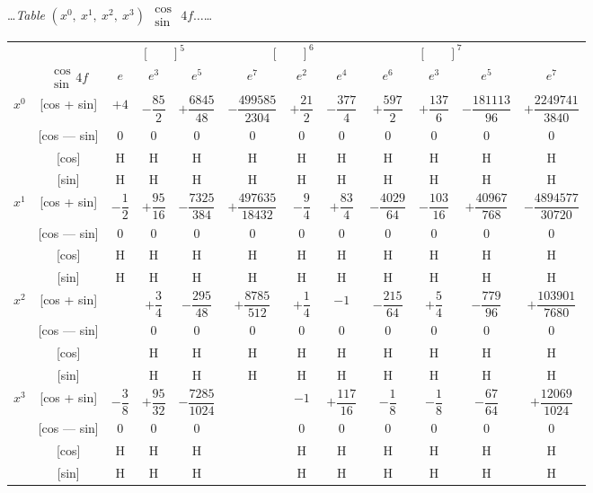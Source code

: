 \documentclass[10pt,a4paper]{article}
\newcommand{\tabletitle}[2]{%
  \begin{center}
  \ldots\textit{Table} #1 $\displaystyle\begin{smallmatrix} \cos \\ \sin \end{smallmatrix}$ #2\ldots
  \end{center}
}
\begin{document}
\newpage
\tabletitle{$(x^0,\ x^1,\ x^2,\ x^3)$}{$4f\ldots$}

\begin{center}
\small
\begin{tabular}{|c|c|c|c|c|c|c|c|c|c|c|c|}
\hline
& & \multicolumn{3}{c|}{$[\phantom{()}]^5$} & \multicolumn{3}{c|}{$[\phantom{()}]^6$} & \multicolumn{3}{c|}{$[\phantom{()}]^7$} \\
\cline{3-11}
& $\begin{smallmatrix} \cos \\ \sin \end{smallmatrix} 4f$ & $e$ & $e^3$ & $e^5$ & $e^7$ & $e^2$ & $e^4$ & $e^6$ & $e^3$ & $e^5$ & $e^7$ \\
\hline
\multirow{4}{*}{$x^0$} & [cos + sin] & $+4$ & $-\dfrac{85}{2}$ & $+\dfrac{6845}{48}$ & $-\dfrac{499585}{2304}$ & $+\dfrac{21}{2}$ & $-\dfrac{377}{4}$ & $+\dfrac{597}{2}$ & $+\dfrac{137}{6}$ & $-\dfrac{181113}{96}$ & $+\dfrac{2249741}{3840}$ \\
& [cos --- sin] & $0$ & $0$ & $0$ & $0$ & $0$ & $0$ & $0$ & $0$ & $0$ & $0$ \\
& [cos] & H & H & H & H & H & H & H & H & H & H \\
& [sin] & H & H & H & H & H & H & H & H & H & H \\
\hline
\multirow{4}{*}{$x^1$} & [cos + sin] & $-\dfrac{1}{2}$ & $+\dfrac{95}{16}$ & $-\dfrac{7325}{384}$ & $+\dfrac{497635}{18432}$ & $-\dfrac{9}{4}$ & $+\dfrac{83}{4}$ & $-\dfrac{4029}{64}$ & $-\dfrac{103}{16}$ & $+\dfrac{40967}{768}$ & $-\dfrac{4894577}{30720}$ \\
& [cos --- sin] & $0$ & $0$ & $0$ & $0$ & $0$ & $0$ & $0$ & $0$ & $0$ & $0$ \\
& [cos] & H & H & H & H & H & H & H & H & H & H \\
& [sin] & H & H & H & H & H & H & H & H & H & H \\
\hline
\multirow{4}{*}{$x^2$} & [cos + sin] & & $+\dfrac{3}{4}$ & $-\dfrac{295}{48}$ & $+\dfrac{8785}{512}$ & $+\dfrac{1}{4}$ & $-1$ & $-\dfrac{215}{64}$ & $+\dfrac{5}{4}$ & $-\dfrac{779}{96}$ & $+\dfrac{103901}{7680}$ \\
& [cos --- sin] & & $0$ & $0$ & $0$ & $0$ & $0$ & $0$ & $0$ & $0$ & $0$ \\
& [cos] & & H & H & H & H & H & H & H & H & H \\
& [sin] & & H & H & H & H & H & H & H & H & H \\
\hline
\multirow{4}{*}{$x^3$} & [cos + sin] & $-\dfrac{3}{8}$ & $+\dfrac{95}{32}$ & $-\dfrac{7285}{1024}$ & & $-1$ & $+\dfrac{117}{16}$ & $-\dfrac{1}{8}$ & $-\dfrac{1}{8}$ & $-\dfrac{67}{64}$ & $+\dfrac{12069}{1024}$ \\
& [cos --- sin] & $0$ & $0$ & $0$ & & $0$ & $0$ & $0$ & $0$ & $0$ & $0$ \\
& [cos] & H & H & H & & H & H & H & H & H & H \\
& [sin] & H & H & H & & H & H & H & H & H & H \\
\hline
\end{tabular}
\end{center}
\end{document}

